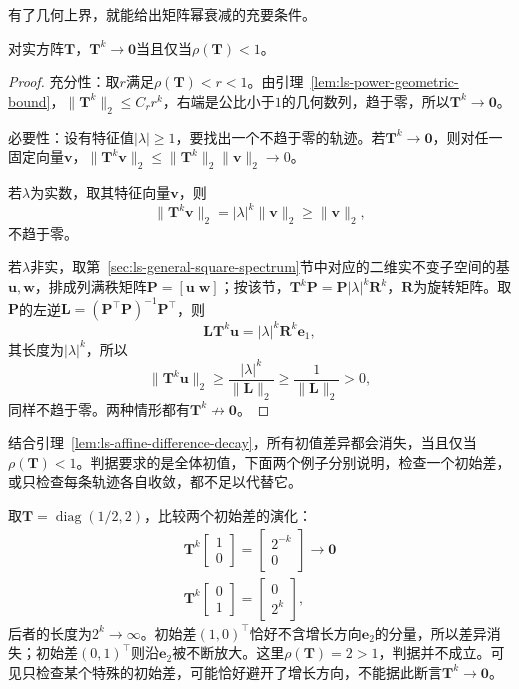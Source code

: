 有了几何上界，就能给出矩阵幂衰减的充要条件。
\begin{theorem}[矩阵幂的衰减判据]
\label{thm:ls-power-decay}
对实方阵$\bm T$，$\bm T^k\to\bm0$当且仅当$\rho(\bm T)<1$。
\end{theorem}
\begin{proof}
充分性：取$r$满足$\rho(\bm T)<r<1$。由引理~\ref{lem:ls-power-geometric-bound}，$\lVert\bm T^k\rVert_2\leq C_rr^k$，右端是公比小于$1$的几何数列，趋于零，所以$\bm T^k\to\bm0$。

必要性：设有特征值$|\lambda|\geq1$，要找出一个不趋于零的轨迹。若$\bm T^k\to\bm0$，则对任一固定向量$\bm v$，$\lVert\bm T^k\bm v\rVert_2\leq\lVert\bm T^k\rVert_2\lVert\bm v\rVert_2\to0$。

若$\lambda$为实数，取其特征向量$\bm v$，则
\[
 \lVert\bm T^k\bm v\rVert_2=|\lambda|^k\lVert\bm v\rVert_2\geq\lVert\bm v\rVert_2 ,
\]
不趋于零。

若$\lambda$非实，取第~\ref{sec:ls-general-square-spectrum}节中对应的二维实不变子空间的基$\bm u,\bm w$，排成列满秩矩阵$\bm P=[\bm u\;\bm w]$；按该节，$\bm T^k\bm P=\bm P|\lambda|^k\bm R^k$，$\bm R$为旋转矩阵。取$\bm P$的左逆$\bm L=(\bm P^\top\bm P)^{-1}\bm P^\top$，则
\[
 \bm L\bm T^k\bm u=|\lambda|^k\bm R^k\bm e_1 ,
\]
其长度为$|\lambda|^k$，所以
\[
 \lVert\bm T^k\bm u\rVert_2\geq\frac{|\lambda|^k}{\lVert\bm L\rVert_2}\geq\frac1{\lVert\bm L\rVert_2}>0,
\]
同样不趋于零。两种情形都有$\bm T^k\not\to\bm0$。
\end{proof}
结合引理~\ref{lem:ls-affine-difference-decay}，所有初值差异都会消失，当且仅当$\rho(\bm T)<1$。判据要求的是全体初值，下面两个例子分别说明，检查一个初始差，或只检查每条轨迹各自收敛，都不足以代替它。

\begin{example}[反例：一个初始差衰减不能说明全部衰减]
\label{ex:ls-partial-convergence}
取$\bm T=\operatorname{diag}(1/2,2)$，比较两个初始差的演化：
\[
\begin{gathered}
\bm T^k\begin{bmatrix}1\\0\end{bmatrix}=\begin{bmatrix}2^{-k}\\0\end{bmatrix}\to\bm0\\
\bm T^k\begin{bmatrix}0\\1\end{bmatrix}=\begin{bmatrix}0\\2^k\end{bmatrix},
\end{gathered}
\]
后者的长度为$2^k\to\infty$。初始差$(1,0)^\top$恰好不含增长方向$\bm e_2$的分量，所以差异消失；初始差$(0,1)^\top$则沿$\bm e_2$被不断放大。这里$\rho(\bm T)=2>1$，判据并不成立。可见只检查某个特殊的初始差，可能恰好避开了增长方向，不能据此断言$\bm T^k\to\bm0$。
\end{example}

